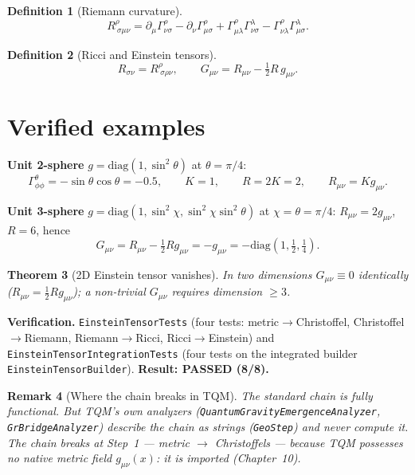 \documentclass[11pt,twoside]{book}
\newtheorem{theorem}{Theorem}[chapter]
\newtheorem{definition}[theorem]{Definition}
\newtheorem{remark}[theorem]{Remark}
\begin{document}
\begin{definition}[Riemann curvature]
\begin{equation}
R^\rho_{\ \sigma\mu\nu} = \partial_\mu \Gamma^\rho_{\nu\sigma}
- \partial_\nu \Gamma^\rho_{\mu\sigma}
+ \Gamma^\rho_{\mu\lambda}\Gamma^\lambda_{\nu\sigma}
- \Gamma^\rho_{\nu\lambda}\Gamma^\lambda_{\mu\sigma}.
\end{equation}
\end{definition}

\begin{definition}[Ricci and Einstein tensors]
\begin{equation}
R_{\sigma\nu} = R^\rho_{\ \sigma\rho\nu}, \qquad
G_{\mu\nu} = R_{\mu\nu} - \tfrac12 R\, g_{\mu\nu}.
\end{equation}
\end{definition}

\section{Verified examples}

\textbf{Unit 2-sphere} $g=\mathrm{diag}(1,\sin^2\theta)$ at $\theta=\pi/4$:
\begin{equation}
\Gamma^\theta_{\phi\phi} = -\sin\theta\cos\theta = -0.5,
\qquad K = 1, \qquad R = 2K = 2, \qquad R_{\mu\nu}=K g_{\mu\nu}.
\end{equation}

\textbf{Unit 3-sphere} $g=\mathrm{diag}(1,\sin^2\chi,\sin^2\chi\sin^2\theta)$ at
$\chi=\theta=\pi/4$: $R_{\mu\nu}=2g_{\mu\nu}$, $R=6$, hence
\begin{equation}
G_{\mu\nu} = R_{\mu\nu} - \tfrac12 R g_{\mu\nu} = -g_{\mu\nu}
= -\mathrm{diag}(1,\tfrac12,\tfrac14).
\end{equation}

\begin{theorem}[2D Einstein tensor vanishes]
In two dimensions $G_{\mu\nu}\equiv0$ identically ($R_{\mu\nu}=\tfrac12 R g_{\mu\nu}$); a
non-trivial $G_{\mu\nu}$ requires dimension $\ge3$.
\end{theorem}

\textbf{Verification.} \texttt{EinsteinTensorTests} (four tests: metric$\to$Christoffel,
Christoffel$\to$Riemann, Riemann$\to$Ricci, Ricci$\to$Einstein) and
\texttt{EinsteinTensorIntegrationTests} (four tests on the integrated builder
\texttt{EinsteinTensorBuilder}). \textbf{Result: PASSED (8/8).}

\begin{remark}[Where the chain breaks in TQM]
The standard chain is fully functional. But TQM's own analyzers
(\texttt{QuantumGravityEmergenceAnalyzer}, \texttt{GrBridgeAnalyzer}) \emph{describe} the
chain as strings (\texttt{GeoStep}) and \emph{never compute} it. The chain breaks at
Step~1 — \emph{metric} $\to$ \emph{Christoffels} — because TQM possesses no native metric
field $g_{\mu\nu}(x)$: it is imported (Chapter~10).
\end{remark}
\end{document}
